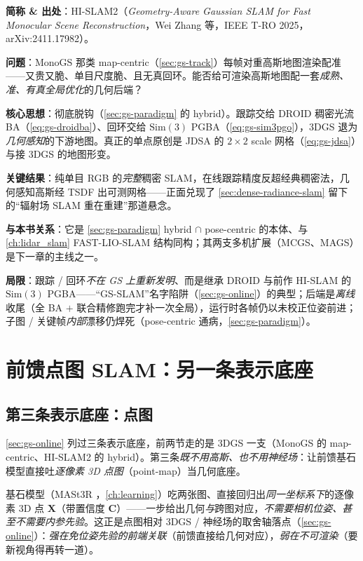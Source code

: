\begin{paper}
\textbf{简称 \& 出处}：HI-SLAM2（\emph{Geometry-Aware Gaussian SLAM for Fast Monocular Scene Reconstruction}，Wei Zhang 等，IEEE T-RO 2025，arXiv:2411.17982）\cite{zhang2024hislam2}。

\textbf{问题}：MonoGS 那类 map-centric（\cref{sec:gs-track}）每帧对重高斯地图渲染配准——又贵又脆、单目尺度脆、且无真回环。能否给可渲染高斯地图配一套\emph{成熟、准、有真全局优化}的几何后端？

\textbf{核心思想}：彻底脱钩（\cref{sec:gs-paradigm} 的 hybrid）。跟踪交给 DROID 稠密光流 BA（\cref{eq:gs-droidba}）、回环交给 $\mathrm{Sim}(3)$ PGBA（\cref{eq:gs-sim3pgo}），3DGS 退为\emph{几何感知}的下游地图。真正的单点原创是 JDSA 的 $2\times2$ scale 网格（\cref{eq:gs-jdsa}）与接 3DGS 的地图形变。

\textbf{关键结果}：纯单目 RGB 的\emph{完整}稠密 SLAM，在线跟踪精度反超经典稠密法，几何感知高斯经 TSDF 出可测网格——正面兑现了 \cref{sec:dense-radiance-slam} 留下的“辐射场 SLAM 重在重建”那道悬念。

\textbf{与本书关系}：它是 \cref{sec:gs-paradigm} hybrid $\cap$ pose-centric 的本体、与 \cref{ch:lidar_slam} FAST-LIO-SLAM 结构同构；其两支多机扩展（MCGS、MAGS）是下一章的主线之一。

\textbf{局限}：跟踪 / 回环\emph{不在 GS 上重新发明}、而是继承 DROID 与前作 HI-SLAM 的 $\mathrm{Sim}(3)$ PGBA——“GS-SLAM”名字陷阱（\cref{sec:gs-online}）的典型；后端是\emph{离线}收尾（全 BA $+$ 联合精修跑完才补一次全局），运行时各帧仍以未校正位姿前进；子图 / 关键帧\emph{内部}漂移仍焊死（pose-centric 通病，\cref{sec:gs-paradigm}）。
\end{paper}

\section{前馈点图 SLAM：另一条表示底座}
\label{sec:gs-pointmap}

\subsection{第三条表示底座：点图}

\cref{sec:gs-online} 列过三条表示底座，前两节走的是 3DGS 一支（MonoGS 的 map-centric、HI-SLAM2 的 hybrid）。第三条\emph{既不用高斯、也不用神经场}：让前馈基石模型直接吐\emph{逐像素 3D 点图}（point-map）当几何底座。

基石模型（MASt3R \cite{leroy2024mast3r}，\cref{ch:learning}）吃两张图、直接回归出\emph{同一坐标系下}的逐像素 3D 点 $\mathbf X$（带置信度 $\mathbf C$）——一步给出几何\emph{与}跨图对应，\emph{不需要相机位姿、甚至不需要内参先验}。这正是点图相对 3DGS / 神经场的取舍轴落点（\cref{sec:gs-online}）：\emph{强在免位姿先验的前端关联}（前馈直接给几何对应），\emph{弱在不可渲染}（要新视角得再转一道）。


